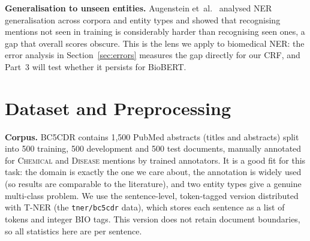 \documentclass[10pt,a4paper]{article}
\newcommand{\chem}{\textsc{Chemical}}
\newcommand{\dis}{\textsc{Disease}}
\begin{document}
\textbf{Generalisation to unseen entities.} Augenstein et~al.\ \cite{augenstein2017generalisation} analysed NER generalisation across corpora and entity types and showed that
recognising mentions not seen in training is considerably harder than recognising seen ones, a gap that overall scores obscure. This
is the lens we apply to biomedical NER: the error analysis in Section~\ref{sec:errors} measures the gap directly for our CRF, and Part~3 will test whether it persists for BioBERT.

\section{Dataset and Preprocessing}
\textbf{Corpus.} BC5CDR \cite{li2016bc5cdr} contains 1{,}500 PubMed abstracts (titles and abstracts) split into 500 training, 500 development and 500 test documents,
manually annotated for \chem{} and \dis{} mentions by trained annotators. It is a good fit for this task: the domain is exactly the one we care about, the annotation is
widely used (so results are comparable to the literature), and two entity types give a genuine multi-class problem. We use the sentence-level, token-tagged
version distributed with T-NER \cite{ushio2021tner} (the \texttt{tner/bc5cdr} data), which stores each sentence as a list of tokens and integer BIO tags.
This version does not retain document boundaries, so all statistics here are per sentence.
\end{document}
